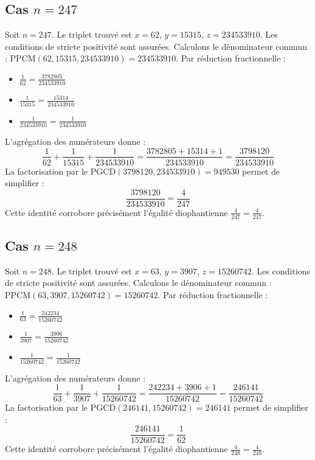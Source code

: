 \documentclass[11pt,a4paper]{article}
\begin{document}
\subsection{Cas $n = 247$}
Soit $n = 247$. Le triplet trouvé est $x = 62$, $y = 15315$, $z = 234533910$.
Les conditions de stricte positivité sont assurées.
Calculons le dénominateur commun : $\text{PPCM}(62, 15315, 234533910) = 234533910$.
Par réduction fractionnelle :
\begin{itemize}
    \item $\frac{1}{62} = \frac{3782805}{234533910}$
    \item $\frac{1}{15315} = \frac{15314}{234533910}$
    \item $\frac{1}{234533910} = \frac{1}{234533910}$
\end{itemize}
L'agrégation des numérateurs donne :
$$ \frac{1}{62} + \frac{1}{15315} + \frac{1}{234533910} = \frac{3782805 + 15314 + 1}{234533910} = \frac{3798120}{234533910} $$
La factorisation par le $\text{PGCD}(3798120, 234533910) = 949530$ permet de simplifier :
$$ \frac{3798120}{234533910} = \frac{4}{247} $$
Cette identité corrobore précisément l'égalité diophantienne $\frac{4}{247} = \frac{4}{247}$.

\subsection{Cas $n = 248$}
Soit $n = 248$. Le triplet trouvé est $x = 63$, $y = 3907$, $z = 15260742$.
Les conditions de stricte positivité sont assurées.
Calculons le dénominateur commun : $\text{PPCM}(63, 3907, 15260742) = 15260742$.
Par réduction fractionnelle :
\begin{itemize}
    \item $\frac{1}{63} = \frac{242234}{15260742}$
    \item $\frac{1}{3907} = \frac{3906}{15260742}$
    \item $\frac{1}{15260742} = \frac{1}{15260742}$
\end{itemize}
L'agrégation des numérateurs donne :
$$ \frac{1}{63} + \frac{1}{3907} + \frac{1}{15260742} = \frac{242234 + 3906 + 1}{15260742} = \frac{246141}{15260742} $$
La factorisation par le $\text{PGCD}(246141, 15260742) = 246141$ permet de simplifier :
$$ \frac{246141}{15260742} = \frac{1}{62} $$
Cette identité corrobore précisément l'égalité diophantienne $\frac{4}{248} = \frac{4}{248}$.
\end{document}
